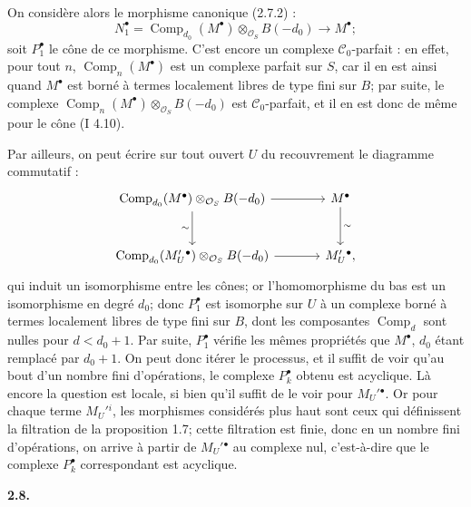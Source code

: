 On
considère alors le morphisme canonique (2.7.2) :
\[
  N_1^{\bullet}=\operatorname{Comp}_{d_0}(M^{\bullet})\otimes_{\mathcal O_S}B(-d_0)
  \longrightarrow M^{\bullet};
\]
soit $P_1^{\bullet}$ le cône de ce morphisme. C'est encore un complexe $\mathcal C_0$-parfait : en effet, pour tout $n$, $\operatorname{Comp}_n(M^{\bullet})$ est un complexe parfait sur $S$, car il en est ainsi quand $M^{\bullet}$ est borné à termes localement libres de type fini sur $B$; par suite, le complexe $\operatorname{Comp}_n(M^{\bullet})\otimes_{\mathcal O_S}B(-d_0)$ est $\mathcal C_0$-parfait, et il en est donc de même pour le cône (I 4.10).

Par ailleurs, on peut écrire sur tout ouvert $U$ du recouvrement le diagramme commutatif :
\[
\begin{tikzcd}[column sep=large,row sep=large]
\operatorname{Comp}_{d_0}(M^{\bullet})\otimes_{\mathcal O_S}B(-d_0) \arrow[r] \arrow[d,"\sim"'] & M^{\bullet} \arrow[d,"\sim"]\\
\operatorname{Comp}_{d_0}(M_U'{}^{\bullet})\otimes_{\mathcal O_S}B(-d_0) \arrow[r] & M_U'{}^{\bullet},
\end{tikzcd}
\]
qui induit un isomorphisme entre les cônes; or l'homomorphisme du bas est un isomorphisme en degré $d_0$; donc $P_1^{\bullet}$ est isomorphe sur $U$ à un complexe borné à termes localement libres de type fini sur $B$, dont les composantes $\operatorname{Comp}_d$ sont nulles pour $d<d_0+1$. Par suite, $P_1^{\bullet}$ vérifie les mêmes propriétés que $M^{\bullet}$, $d_0$ étant remplacé par $d_0+1$. On peut donc itérer le processus, et il suffit de voir qu'au bout d'un nombre fini d'opérations, le complexe $P_k^{\bullet}$ obtenu est acyclique. Là encore la question est locale, si bien qu'il suffit de le voir pour $M_U'{}^{\bullet}$. Or pour chaque terme $M_U'{}^i$, les morphismes considérés plus haut sont ceux qui définissent la filtration de la proposition 1.7; cette filtration est finie, donc en un nombre fini d'opérations, on arrive à partir de $M_U'{}^{\bullet}$ au complexe nul, c'est-à-dire que le complexe $P_k^{\bullet}$ correspondant est acyclique.

\textbf{2.8.}
